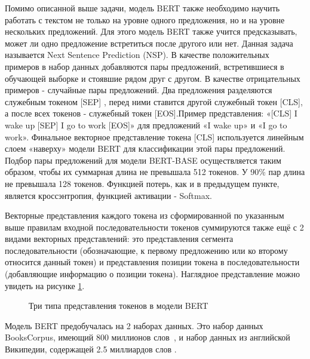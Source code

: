 Помимо описанной выше задачи, модель BERT также необходимо научить работать с текстом не только на уровне одного предложения, но и на уровне нескольких предложений. Для этого модель BERT также учится предсказывать, может ли одно предложение встретиться после другого или нет. Данная задача называется Next Sentence Prediction (NSP). В качестве положительных примеров в набор данных добавляются пары предложений, встретившиеся в обучающей выборке и стоявшие рядом друг с другом. В качестве отрицательных примеров - случайные пары предложений.  Два предложения разделяются служебным токеном [SEP] , перед ними ставится другой служебный токен [CLS], а после всех токенов - служебный токен [EOS].Пример представления: «[CLS] I wake up [SEP] I go to work [EOS]» для предложений «I wake up» и  «I go to work». Финальное векторное представление токена [CLS] используется линейным слоем «наверху» модели BERT для классификации этой пары предложений. Подбор пары предложений для модели BERT-BASE осуществляется таким образом, чтобы их суммарная длина не превышала 512 токенов. У 90\% пар длина не превышала 128 токенов. Функцией потерь, как и в предыдущем пункте, является кроссэнтропия, функцией активации - Softmax.

Векторные представления каждого токена из сформированной по указанным выше правилам входной последовательности токенов суммируются также ещё с 2 видами векторных представлений: это представления сегмента последовательности (обозначающие, к первому предложению или ко второму относится данный токен) и представления позиции токена в последовательности (добавляющие информацию о позиции токена). Наглядное представление можно увидеть на рисунке \ref{fig:Transformer5-BERTTokenTypes}. 

\begin{figure}[ht]
  \caption{Три типа представления токенов в модели BERT}\label{fig:Transformer5-BERTTokenTypes}
\end{figure}
Модель BERT предобучалась на 2 наборах данных. Это набор данных BooksCorpus, имеющий 800 миллионов слов~\cite{zhu_2015}, и набор данных из английской Википедии, содержащей 2.5 миллиардов слов \cite{devlin_2018}. 

